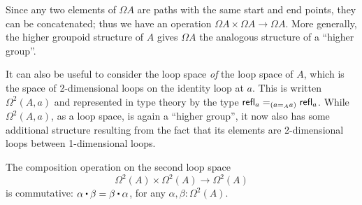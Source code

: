 Since any two elements of $\Omega A$ are paths with the same start and end points, they can be concatenated;
thus we have an operation $\Omega A\times \Omega A\to \Omega A$.
More generally, the higher groupoid structure of $A$ gives $\Omega A$ the analogous structure of a ``higher group''.

It can also be useful to consider the loop space \emph{of} the loop space of $A$, which is the space of 2-dimensional loops on the identity loop at $a$.
This is written $\Omega^2(A,a)$ and represented in type theory by the type $\id[({\id[A]{a}{a}})]{\refl{a}}{\refl{a}}$.
While $\Omega^2(A,a)$, as a loop space, is again a ``higher group'', it now also has some additional structure resulting from the fact that its elements are 2-dimensional loops between 1-dimensional loops.  

\begin{thm}\label{thm:EckmannHilton}
  The composition operation on the second loop space
  \begin{equation*}
    \Omega^2(A)\times \Omega^2(A)\to \Omega^2(A)
  \end{equation*}
  is commutative: $\alpha\ct\beta = \beta\ct\alpha$, for any $\alpha, \beta:\Omega^2(A)$.
\end{thm}

